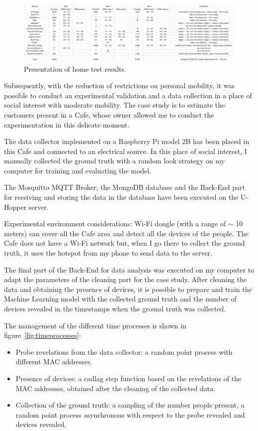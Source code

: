 \begin{figure}[h]
\centering 
\includegraphics[width=1\textwidth]{images/sniffertest} 
\caption{Presentation of home test results.}
\label{fig:sniffertest}
\end{figure}

Subsequently, with the reduction of restrictions on personal mobility, it was possible to conduct an experimental validation and a data collection in a place of social interest with moderate mobility. The case study is to estimate the customers present in a Cafe, whose owner allowed me to conduct the experimentation in this delicate moment.

The data collector implemented on a Raspberry Pi model 2B has been placed in this Cafe and connected to an electrical source. In this place of social interest, I manually collected the ground truth with a random look strategy on my computer for training and evaluating the model.

The Mosquitto MQTT Broker, the MongoDB database and the Back-End part for receiving and storing the data in the database have been executed on the U-Hopper server.

Experimental environment considerations: Wi-Fi dongle (with a range of $\sim$ 10 meters) can cover all the Cafe area and detect all the devices of the people. The Cafe does not have a Wi-Fi network but, when I go there to collect the ground truth, it uses the hotspot from my phone to send data to the server.

The final part of the Back-End for data analysis was executed on my computer to adapt the parameters of the cleaning part for the case study. After cleaning the data and obtaining the presence of devices, it is possible to prepare and train the Machine Learning model with the collected ground truth and the number of devices revealed in the timestamps when the ground truth was collected.


The management of the different time processes is shown in figure~\ref{fig:timeprocesses}:
\begin{itemize}
  \item Probe revelations from the data collector: a random point process with different MAC addresses.
  \item Presence of devices: a cadlag step function based on the revelations of the MAC addresses, obtained after the cleaning of the collected data.
  \item Collection of the ground truth: a sampling of the number people present, a random point process asynchronous with respect to the probe revealed and devices revealed.
\end{itemize}

